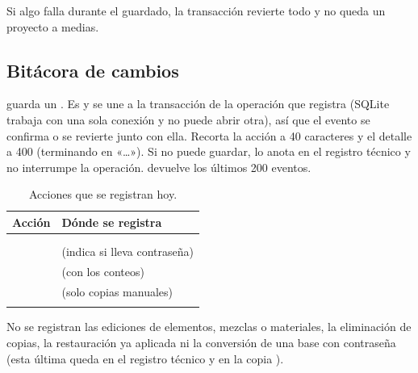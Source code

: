 Si algo falla durante el guardado, la transacción revierte todo y no queda un proyecto a medias.

\subsection{Bitácora de cambios}

 guarda un . Es
 y se une a la transacción de la operación que registra (SQLite trabaja con una sola conexión y no
puede abrir otra), así que el evento se confirma o se revierte junto con ella. Recorta la acción a 40 caracteres y el
detalle a 400 (terminando en «\ldots»). Si no puede guardar, lo anota en el registro técnico y no interrumpe la
operación.  devuelve los últimos 200 eventos.

\begin{table}[H]
	\centering
	\caption{Acciones que se registran hoy.}
	\label{tab:bd-acciones}
	\begin{tabular}{L{5.0cm}L{8.8cm}}
		\hline
		\textbf{Acción} & \textbf{Dónde se registra} \\ \hline
		 &  \\
		 &  \\
		 &  (indica si lleva contraseña) \\
		 &  (con los conteos) \\
		 &  (solo copias manuales) \\
		 &  \\ \hline
	\end{tabular}
\end{table}

No se registran las ediciones de elementos, mezclas o materiales, la eliminación de copias, la restauración ya
aplicada ni la conversión de una base con contraseña (esta última queda en el registro técnico y en la copia
).

